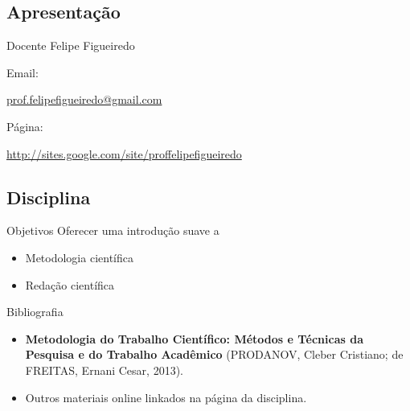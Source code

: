 \documentclass{beamer}
\begin{document}
\subsection{Apresentação}

\begin{frame}{Docente}
Felipe Figueiredo

\bigskip

Email:

\href{mailto:prof.felipefigueiredo@gmail.com}{prof.felipefigueiredo@gmail.com}

\bigskip

Página:

\href{http://sites.google.com/site/proffelipefigueiredo}{http://sites.google.com/site/proffelipefigueiredo}

\end{frame}

\subsection{Disciplina}

\begin{frame}{Objetivos}
Oferecer uma introdução suave a
  \begin{itemize}
  \item Metodologia científica
  \item Redação científica
  \end{itemize}
\end{frame}

\begin{frame}{Bibliografia}
  \begin{itemize}
  \item {\bf Metodologia do Trabalho Científico: Métodos e Técnicas da Pesquisa e do Trabalho Acadêmico} (PRODANOV, Cleber Cristiano; de FREITAS, Ernani Cesar, 2013).
  \item Outros materiais online linkados na página da disciplina.
  \end{itemize}
\end{frame}
\end{document}
